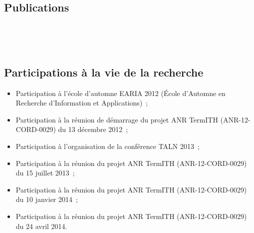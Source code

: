     \clearpage
    \subsection{Publications}



      \\





      \\






    \subsection{Participations à la vie de la recherche}
      \begin{itemize}
        \item{Participation à l'école d'automne EARIA 2012 (École d'Automne en
              Recherche d'Information et Applications)~;}
        \item{Participation à la réunion de démarrage du projet ANR TermITH
              (ANR-12-CORD-0029) du 13 décembre 2012~;}
        \item{Participation à l'organisation de la conférence TALN 2013~;}
        \item{Participation à la réunion du projet ANR TermITH (ANR-12-CORD-0029) du
              15 juillet 2013~;}
        \item{Participation à la réunion du projet ANR TermITH (ANR-12-CORD-0029) du
              10 janvier 2014~;}
        \item{Participation à la réunion du projet ANR TermITH (ANR-12-CORD-0029) du
              24 avril 2014.}
      \end{itemize}



